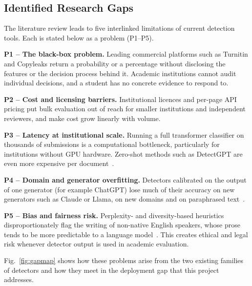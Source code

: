 \subsection{Identified Research Gaps}

The literature review leads to five interlinked limitations of current
detection tools. Each is stated below as a problem (P1--P5).

\textbf{P1 -- The black-box problem.} Leading commercial platforms such as
Turnitin and Copyleaks return a probability or a percentage without
disclosing the features or the decision process behind it. Academic
institutions cannot audit individual decisions, and a student has no concrete
evidence to respond to.

\textbf{P2 -- Cost and licensing barriers.} Institutional licences and
per-page API pricing put bulk evaluation out of reach for smaller
institutions and independent reviewers, and make cost grow linearly with
volume.

\textbf{P3 -- Latency at institutional scale.} Running a full transformer
classifier on thousands of submissions is a computational bottleneck,
particularly for institutions without GPU hardware. Zero-shot methods such as
DetectGPT are even more expensive per document~\cite{mitchell2023detectgpt}.

\textbf{P4 -- Domain and generator overfitting.} Detectors calibrated on the
output of one generator (for example ChatGPT) lose much of their accuracy on
new generators such as Claude or Llama, on new domains and on paraphrased
text~\cite{dugan2024raid,wang2024m4,li2024mage,krishna2023paraphrasing}.

\textbf{P5 -- Bias and fairness risk.} Perplexity- and diversity-based
heuristics disproportionately flag the writing of non-native English speakers,
whose prose tends to be more predictable to a language model~\cite{liang2023biased}.
This creates ethical and legal risk whenever detector output is used in
academic evaluation.

Fig.~\ref{fig:gapmap} shows how these problems arise from the two existing
families of detectors and how they meet in the deployment gap that this
project addresses.

